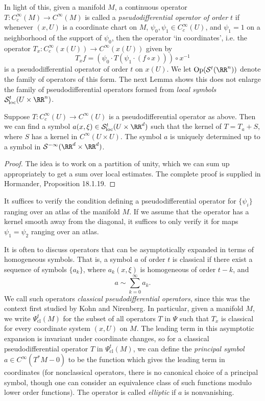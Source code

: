 In light of this, given a manifold $M$, a continuous operator $T: C_c^\infty(M) \to C^\infty(M)$ is called a \emph{pseudodifferential operator of order $t$} if whenever $(x,U)$ is a coordinate chart on $M$, $\psi_0, \psi_1 \in C_c^\infty(U)$, and $\psi_1 = 1$ on a neighborhood of the support of $\psi_0$, then the operator `in coordinates', i.e. the operator $T_x: C_c^\infty(x(U)) \to C^\infty(x(U))$ given by
%
\[ T_x f = \left( \psi_0 \cdot T(\psi_1 \cdot (f \circ x)) \right) \circ x^{-1} \]
%
is a pseudodifferential operator of order $t$ on $x(U)$. We let $\text{Op}(\mathcal{S}^t(\RR^n))$ denote the family of operators of this form. The next Lemma shows this does not enlarge the family of pseudodifferential operators formed from \emph{local symbols} $\mathcal{S}^t_{\text{loc}}(U \times \RR^n)$.

\begin{lemma}
    Suppose $T: C_c^\infty(U) \to C^\infty(U)$ is a pseudodifferential operator as above. Then we can find a symbol $a(x,\xi) \in \mathcal{S}^t_{\text{loc}}(U \times \RR^d)$ such that the kernel of $T = T_a + S$, where $S$ has a kernel in $C^\infty(U \times U)$. The symbol $a$ is uniquely determined up to a symbol in $\mathcal{S}^{-\infty}(\RR^d \times \RR^d)$.
\end{lemma}
\begin{proof}
    The idea is to work on a partition of unity, which we can sum up appropriately to get a sum over local estimates. The complete proof is supplied in Hormander, Proposition 18.1.19.
\end{proof}

\begin{remark}
    It suffices to verify the condition defining a pseudodifferential operator for $\{ \psi_i \}$ ranging over an atlas of the manifold $M$. If we assume that the operator has a kernel smooth away from the diagonal, it suffices to only verify it for maps $\psi_1 = \psi_2$ ranging over an atlas.
\end{remark}

It is often to discuss operators that can be asymptotically expanded in terms of homogeneous symbols. That is, a symbol $a$ of order $t$ is classical if there exist a sequence of symbols $\{ a_k \}$, where $a_k(x,\xi)$ is homogeneous of order $t - k$, and
%
\[ a \sim \sum_{k = 0}^\infty a_k. \]
%
We call such operators \emph{classical pseudodifferential operators}, since this was the context first studied by Kohn and Nirenberg. In particular, given a manifold $M$, we write $\Psi_{\text{cl}}^t(M)$ for the subset of all operators $T$ in $\Psi$ such that $T_x$ is classical for every coordinate system $(x,U)$ on $M$. The leading term in this asymptotic expansion is invariant under coordinate changes, so for a classical pseudodifferential operator $T$ in $\Psi_{\text{cl}}^t(M)$, we can define the \emph{principal symbol} $a \in C^\infty(T^* M - 0)$ to be the function which gives the leading term in coordinates (for nonclassical operators, there is no canonical choice of a principal symbol, though one can consider an equivalence class of such functions modulo lower order functions). The operator is called \emph{elliptic} if $a$ is nonvanishing.

